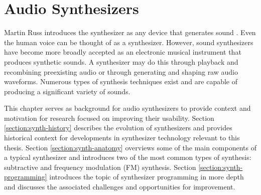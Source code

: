 \chapter{Audio Synthesizers}
\label{chapter:background}

\graphicspath{{./}{./figures/}{./figures/background/}}

Martin Russ introduces the synthesizer as any device that generates sound \cite{russ2012sound}.  Even the human voice can be thought of as a synthesizer. However, sound synthesizers have become more broadly accepted as an electronic musical instrument that produces synthetic sounds. A synthesizer may do this through playback and recombining preexisting audio or through generating and shaping raw audio waveforms. Numerous types of synthesis techniques exist and are capable of producing a significant variety of sounds.


This chapter serves as background for audio synthesizers to provide context and motivation for research focused on improving their usability. Section \ref{section:synth-history} describes the evolution of synthesizers and provides historical context for developments in synthesizer technology relevant to this thesis. Section \ref{section:synth-anatomy} overviews some of the main components of a typical synthesizer and introduces two of the most common types of synthesis: subtractive and frequency modulation (FM) synthesis. Section \ref{section:synth-programming} introduces the topic of synthesizer programming in more depth and discusses the associated challenges and opportunities for improvement.



